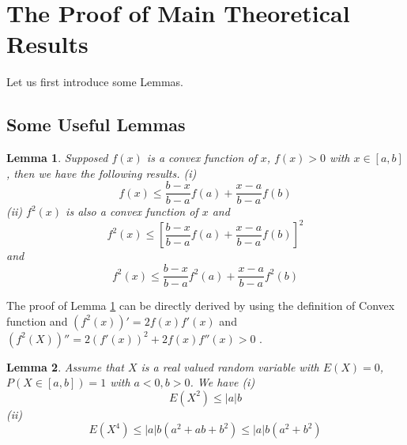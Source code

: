 \documentclass[journal]{IEEEtran}
\newtheorem{lem}{Lemma}
\begin{document}
\section{The Proof of Main Theoretical Results}

Let us first introduce some Lemmas.

\subsection{Some Useful Lemmas}
\begin{lem}\label{lemma1}
Supposed $f(x)$ is a convex function of $x$, $f(x)>0$ with $x\in [a,b]$, then we have the following results.
(i)
\begin{equation*}
  f(x)\leq \frac{b-x}{b-a}f(a)+\frac{x-a}{b-a}f(b)
\end{equation*}
(ii) $f^2(x)$ is also a convex function of $x$ and
\begin{equation*}
  f^2(x)\leq [\frac{b-x}{b-a}f(a)+\frac{x-a}{b-a}f(b)]^2
\end{equation*}
and
\begin{equation*}
  f^2(x)\leq \frac{b-x}{b-a}f^2(a)+\frac{x-a}{b-a}f^2(b)
\end{equation*}
\end{lem}
The proof of Lemma \ref{lemma1} can be directly derived by using the definition of Convex function and $(f^2(x))'=2f(x)f'(x)$ and $(f^2(X))''=2(f'(x))^2+2f(x)f''(x)>0$ .

\begin{lem}\label{lemma2}
 Assume that $X$ is a real valued random variable with $E(X)=0$, $P(X\in [a, b])=1$ with $a<0,b>0$. We have
(i) \begin{equation}\label{x2}
  E(X^2)\leq |a|b
\end{equation}
(ii) \begin{equation}\label{x4}
  E(X^4)\leq |a|b(a^2+ab+b^2)\leq|a|b(a^2+b^2)
\end{equation}
\end{lem}
\end{document}
